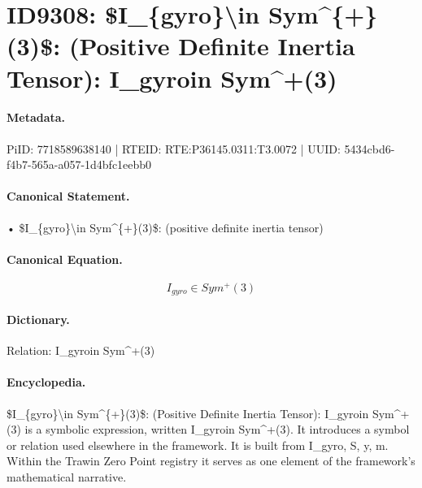 \section*{ID9308: \$I\_\{gyro\}\textbackslash{}in Sym\textasciicircum{}\{+\}(3)\$: (Positive Definite Inertia Tensor): I\_gyroin Sym\textasciicircum{}+(3)}
\paragraph{Metadata.}
PiID: 7718589638140 | RTEID: RTE:P36145.0311:T3.0072 | UUID: 5434cbd6-f4b7-565a-a057-1d4bfc1eebb0

\paragraph{Canonical Statement.}
• \$I\_\{gyro\}\textbackslash{}in Sym\textasciicircum{}\{+\}(3)\$: (positive definite inertia tensor)

\paragraph{Canonical Equation.}
\[
I_{gyro}\in Sym^{+}(3)
\]

\paragraph{Dictionary.}
Relation: I\_gyroin Sym\textasciicircum{}+(3)

\paragraph{Encyclopedia.}
\$I\_\{gyro\}\textbackslash{}in Sym\textasciicircum{}\{+\}(3)\$: (Positive Definite Inertia Tensor): I\_gyroin Sym\textasciicircum{}+(3) is a symbolic expression, written I\_gyroin Sym\textasciicircum{}+(3). It introduces a symbol or relation used elsewhere in the framework. It is built from I\_gyro, S, y, m. Within the Trawin Zero Point registry it serves as one element of the framework's mathematical narrative.

